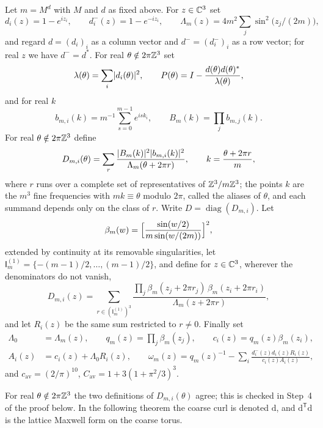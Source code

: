 \begin{definition}\label{ch05:def:flat-symbols}
Let $m=M^d$ with $M$ and $d$ as fixed above. For $z\in\mathbb C^3$ set
\[
 d_i(z)=1-e^{iz_i},\qquad d_i^-(z)=1-e^{-iz_i},\qquad
 \Lambda_m(z)=4m^2\sum_j\sin^2\bigl(z_j/(2m)\bigr),
\]
and regard $d=(d_i)_i$ as a column vector and $d^-=(d^-_i)_i$ as a row vector; for real $z$ we have $d^-=d^*$. For real $\theta\notin2\pi\mathbb Z^3$ set
\[
 \lambda(\theta)=\sum_i\lvert d_i(\theta)\rvert^2,\qquad P(\theta)=I-\frac{d(\theta)d(\theta)^*}{\lambda(\theta)},
\]
and for real $k$
\[
 b_{m,i}(k)=m^{-1}\sum_{s=0}^{m-1}e^{isk_i},\qquad B_m(k)=\prod_jb_{m,j}(k).
\]
For real $\theta\notin2\pi\mathbb Z^3$ define
\[
 D_{m,i}(\theta)=\sum_r\frac{\lvert B_m(k)\rvert^2\lvert b_{m,i}(k)\rvert^2}{\Lambda_m(\theta+2\pi r)},\qquad k=\frac{\theta+2\pi r}m,
\]
where $r$ runs over a complete set of representatives of $\mathbb Z^3/m\mathbb Z^3$; the points $k$ are the $m^3$ fine frequencies with $mk\equiv\theta$ modulo $2\pi$, called the aliases of $\theta$, and each summand depends only on the class of $r$. Write $D=\operatorname{diag}(D_{m,i})$. Let
\[
 \beta_m(w)=\Bigl[\frac{\sin(w/2)}{m\sin(w/(2m))}\Bigr]^2,
\]
extended by continuity at its removable singularities, let $\mathsf I_m^{(1)}=\{-(m-1)/2,\ldots,(m-1)/2\}$, and define for $z\in\mathbb C^3$, wherever the denominators do not vanish,
\begin{equation}\label{ch05:eq:holomorphic-alias}
 D_{m,i}(z)=\sum_{r\in(\mathsf I_m^{(1)})^3}\frac{\prod_j\beta_m(z_j+2\pi r_j)\,\beta_m(z_i+2\pi r_i)}{\Lambda_m(z+2\pi r)},
\end{equation}
and let $R_i(z)$ be the same sum restricted to $r\ne0$. Finally set
\[
 \begin{aligned}
 \Lambda_0&=\Lambda_m(z),\qquad q_m(z)=\prod_j\beta_m(z_j),\qquad c_i(z)=q_m(z)\beta_m(z_i),\\
 A_i(z)&=c_i(z)+\Lambda_0R_i(z),\qquad
 \omega_m(z)=q_m(z)^{-1}-\sum_i\frac{d_i^-(z)d_i(z)R_i(z)}{c_i(z)A_i(z)},
 \end{aligned}
\]
and $c_{\mathrm{av}}=(2/\pi)^{10}$, $C_{\mathrm{av}}=1+3(1+\pi^2/3)^3$.
\end{definition}

For real $\theta\notin2\pi\mathbb Z^3$ the two definitions of $D_{m,i}(\theta)$ agree; this is checked in Step~4 of the proof below. In the following theorem the coarse curl is denoted $\mathrm d$, and $\mathrm d^{\mathsf T}\mathrm d$ is the lattice Maxwell form on the coarse torus.

